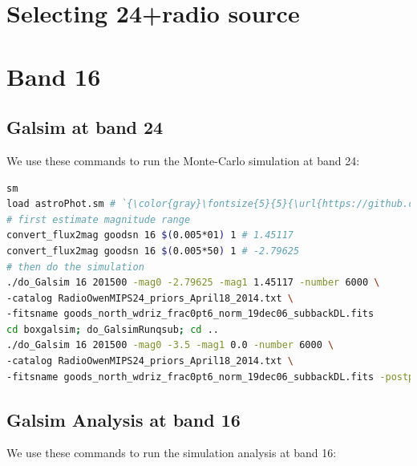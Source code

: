 \documentclass[11pt,a4paper]{article}
\begin{document}

\clearpage


\section{Selecting 24+radio source}


\clearpage


\section{Band 16}
\subsection{Galsim at band 24}

We use these commands to run the Monte-Carlo simulation at band 24:

\begin{lstlisting}[language=bash]
sm
load astroPhot.sm # `{\color{gray}\fontsize{5}{5}{\url{https://github.com/1054/DeepFields.SuperDeblending/blob/master/Softwares/Supermongo_macro/astroPhot.sm}}}`
# first estimate magnitude range
convert_flux2mag goodsn 16 $(0.005*01) 1 # 1.45117
convert_flux2mag goodsn 16 $(0.005*50) 1 # -2.79625
# then do the simulation
./do_Galsim 16 201500 -mag0 -2.79625 -mag1 1.45117 -number 6000 \
-catalog RadioOwenMIPS24_priors_April18_2014.txt \
-fitsname goods_north_wdriz_frac0pt6_norm_19dec06_subbackDL.fits
cd boxgalsim; do_GalsimRunqsub; cd ..
./do_Galsim 16 201500 -mag0 -3.5 -mag1 0.0 -number 6000 \
-catalog RadioOwenMIPS24_priors_April18_2014.txt \
-fitsname goods_north_wdriz_frac0pt6_norm_19dec06_subbackDL.fits -postparallel
\end{lstlisting}

\subsection{Galsim Analysis at band 16}

We use these commands to run the simulation analysis at band 16:
\end{document}

